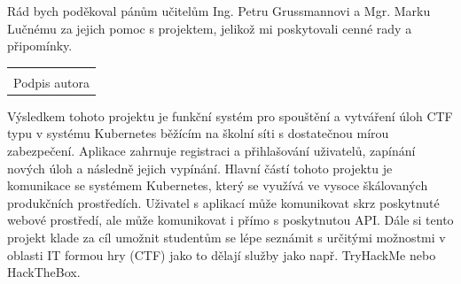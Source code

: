 \documentclass[12pt, a4paper,
twoside,        %
openright
]{report}
\newcommand\datumOdevzdani{1. 1. 2025} %
\begin{document}
\cleardoublepage %
	

	
	\noindent Rád bych poděkoval pánům učitelům Ing. Petru Grussmannovi a Mgr. Marku Lučnému za jejich pomoc s projektem, jelikož mi poskytovali cenné rady a připomínky.

	
	\vspace*{0.7\textheight} %

	\vfill
	\noindent{V Opavě \datumOdevzdani\\}
	\noindent
	\begin{minipage}{\linewidth}
		\hspace{9.5cm} 
		\begin{tabular}{@{}p{6cm}@{}}
			\dotfill \\
			Podpis autora
		\end{tabular}
	\end{minipage}
	
	\cleardoublepage %


	\noindent Výsledkem tohoto projektu je funkční systém pro spouštění a vytváření úloh CTF typu v systému Kubernetes běžícím na školní síti s dostatečnou mírou zabezpečení. Aplikace zahrnuje registraci a přihlašování uživatelů, zapínání nových úloh a následně jejich vypínání. Hlavní částí tohoto projektu je komunikace se systémem Kubernetes, který se využívá ve vysoce škálovaných produkčních prostředích. Uživatel s aplikací může komunikovat skrz poskytnuté webové prostředí, ale může komunikovat i přímo s poskytnutou API. Dále si tento projekt klade za cíl umožnit studentům se lépe seznámit s určitými možnostmi v oblasti IT formou hry (CTF) jako to dělají služby jako např. TryHackMe nebo HackTheBox.
	
\end{document}
